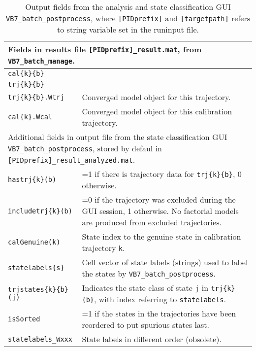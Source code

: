 \begin{table*}
\caption{Output fields from the analysis and state classification GUI 
\texttt{VB7\_batch\_postprocess}, where \texttt{[PIDprefix]} and \texttt{[targetpath]} refers to 
string variable set in the runinput file.}\label{tab:results}
\begin{center}
\begin{tabular}{|l|l|}
\hline
\multicolumn{2}{|l|}{
         \parbox[t]{1.5\columnwidth}{Fields in results
        file \texttt{[PIDprefix]\_result.mat},
        from \texttt{VB7\_batch\_manage}.}}
\\\hline
\texttt{cal\{k\}\{b\}}& \parboxc{}\\\hline
\texttt{trj\{k\}\{b\}}& \parboxc{}\\\hline
\texttt{trj\{k\}\{b\}.Wtrj}&Converged model object for this trajectory.\\\hline
\texttt{cal\{k\}.Wcal}&Converged model object for this calibration trajectory.\\\hline
\hline
\multicolumn{2}{|l|}{\parbox[t]{1.5\columnwidth}{
        Additional fields in output file from the state classification
        GUI \texttt{VB7\_batch\_postprocess}, stored by defaul
        in \texttt{[PIDprefix]\_result\_analyzed.mat}.}}
\\\hline
\texttt{hastrj\{k\}(b)}& =1 if there is trajectory data for \texttt{trj\{k\}\{b\}}, 0 otherwise.
\\\hline
\texttt{includetrj\{k\}(b)}& \parbox[t]{1.25\columnwidth}{
=0 if the trajectory was excluded during the GUI session, 1
otherwise. No factorial models are produced from excluded
trajectories.  }\\\hline
\texttt{calGenuine(k)}& 
State index to the genuine state in calibration trajectory \texttt{k}.
\\\hline
\texttt{statelabels\{s\}}& \parbox[t]{1.25\columnwidth}{
Cell vector of state labels (strings) used to label the states
by \texttt{VB7\_batch\_postprocess}.}
\\\hline
\texttt{trjstates\{k\}\{b\}(j)}& \parbox[t]{1.25\columnwidth}{
Indicates the state class of state \texttt{j}
in \texttt{trj\{k\}\{b\}}, with index referring
to \texttt{statelabels}.
}\\\hline
\texttt{isSorted}&\parbox[t]{1.25\columnwidth}{
=1 if the states in the trajectories have been reordered to put
spurious states last.}\\
\hline
\texttt{statelabels\_Wxxx}& \parbox[t]{1.25\columnwidth}{
State labels in different order (obsolete).}\\

\end{tabular}
\end{center}
\end{table*}

